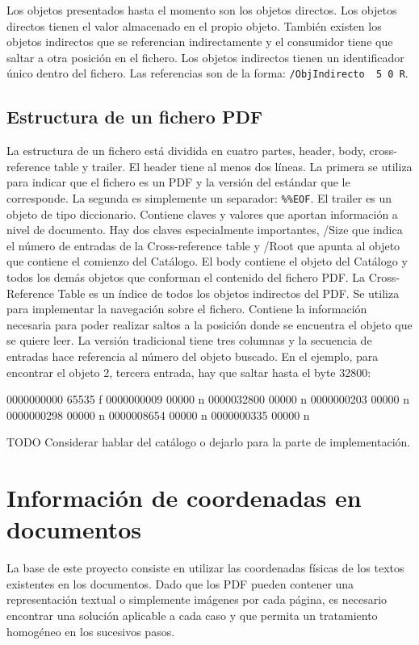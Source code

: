 Los objetos presentados hasta el momento son los objetos directos. Los objetos directos tienen el valor almacenado en el propio objeto. También existen los objetos indirectos que se referencian indirectamente y el consumidor tiene que saltar a otra posición en el fichero. Los objetos indirectos tienen un identificador único dentro del fichero. Las referencias son de la forma: \verb|/ObjIndirecto  5 0 R|.

\subsection{Estructura de un fichero PDF}

La estructura de un fichero está dividida en cuatro partes, header, body, cross-reference table y trailer. El header tiene al menos dos líneas. La primera se utiliza para indicar que el fichero es un PDF y la versión del estándar que le corresponde. La segunda es simplemente un separador: \verb|%%EOF|. El trailer es un objeto de tipo diccionario. Contiene claves y valores que aportan información a nivel de documento. Hay dos claves especialmente importantes, /Size que indica el número de entradas de la Cross-reference table y /Root que apunta al objeto que contiene el comienzo del Catálogo. El body contiene el objeto del Catálogo y todos los demás objetos que conforman el contenido del fichero PDF. La Cross-Reference Table es un índice de todos los objetos indirectos del PDF. Se utiliza para implementar la navegación sobre el fichero. Contiene la información necesaria para poder realizar saltos a la posición donde se encuentra el objeto que se quiere leer. La versión tradicional tiene tres columnas y la secuencia de entradas hace referencia al número del objeto buscado. En el ejemplo, para encontrar el objeto 2, tercera entrada, hay que saltar hasta el byte 32800:

0000000000 65535 f
0000000009 00000 n
0000032800 00000 n
0000000203 00000 n
0000000298 00000 n
0000008654 00000 n
0000000335 00000 n

TODO Considerar hablar del catálogo o dejarlo para la parte de implementación.


\section{Información de coordenadas en documentos}

La base de este proyecto consiste en utilizar las coordenadas físicas de los textos existentes en los documentos. Dado que los PDF pueden contener una representación textual o simplemente imágenes por cada página, es necesario encontrar una solución aplicable a cada caso y que permita un tratamiento homogéneo en los sucesivos pasos.


